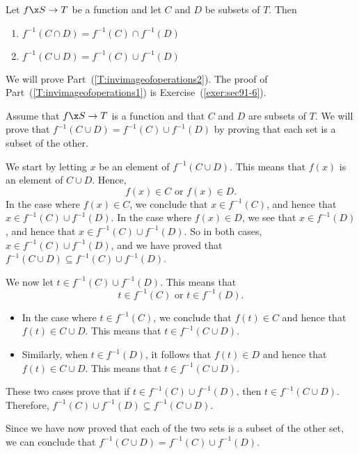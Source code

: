 \begin{theorem} \label{T:invimageofoperations}
Let $f\x S \to T$ be a function and let $C$ and $D$ be subsets of $T$.  Then
\begin{enumerate}
\item $f^{-1} ( C \cap D ) = f^{-1} ( C ) \cap f^{-1} ( D )$
\label{T:invimageofoperations1}
%

\item $f^{-1} ( C \cup D ) = f^{-1} ( C ) \cup f^{-1} ( D )$
\label{T:invimageofoperations2}
%
\end{enumerate}
\end{theorem}
%
\begin{myproof}
We will prove Part~(\ref{T:invimageofoperations2}).  The proof of 
Part~(\ref{T:invimageofoperations1}) is Exercise~(\ref{exer:sec91-6}).

Assume that $f\x S \to T$ is a function and that $C$ and $D$ are subsets of $T$.  We will prove that $f^{-1} ( C \cup D ) = f^{-1} ( C ) \cup f^{-1} ( D )$ by proving that each set is a subset of the other.

We start by letting $x$ be an element of $f^{-1} ( C \cup D )$.  This means that 
$f ( x )$ is an element of $C \cup D$.  Hence,
\[
f ( x ) \in C \text{ or } f ( x ) \in D.
\]
In the case where $f ( x ) \in C$, we conclude that $x \in f^{-1} ( C )$, and hence that $x \in f^{-1} ( C ) \cup f^{-1} ( D )$.  In the case where $f ( x ) \in D$, we see that $x \in f^{-1} ( D )$, and hence that 
$x \in f^{-1} ( C ) \cup f^{-1} ( D )$.  So in both cases, 
$x \in f^{-1} ( C ) \cup f^{-1} ( D )$, and we have proved that 
$f^{-1} ( C \cup D ) \subseteq f^{-1} ( C ) \cup f^{-1} ( D )$.

We now let $t \in f^{-1} ( C ) \cup f^{-1} ( D )$.  This means that
\[
t \in f^{-1} ( C ) \text{ or } t \in f^{-1} ( D ).
\]
\begin{itemize}
\item In the case where $t \in f^{-1} ( C )$, we conclude that 
$f ( t ) \in C$ and hence that $f ( t ) \in C \cup D$.  This means that 
$t \in f^{-1} ( C \cup D )$.

\item Similarly, when $t \in f^{-1} ( D )$, it follows that 
$f ( t ) \in D$ and hence that $f ( t ) \in C \cup D$.  This means that 
$t \in f^{-1} ( C \cup D )$.
\end{itemize}

These two cases prove that if $t \in f^{-1} ( C ) \cup f^{-1} ( D )$, then 
$t \in f^{-1} ( C \cup D )$.  Therefore, 
$f^{-1} ( C ) \cup f^{-1} ( D ) \subseteq f^{-1} ( C \cup D )$.

Since we have now proved that each of the two sets is a subset of the other set, we can conclude that $f^{-1} ( C \cup D ) = f^{-1} ( C ) \cup f^{-1} ( D )$.
\end{myproof}
